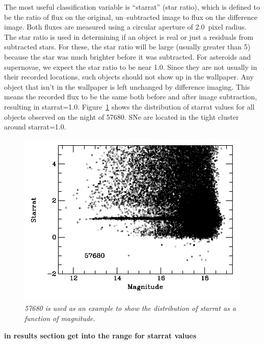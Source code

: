 \documentclass[aps,prb,twocolumn,superscriptaddress]{revtex4-1}
\begin{document}
%
The most useful classification variable is ``starrat'' (star ratio), 
which is defined to be the ratio of flux on the original, un--subtracted 
image to flux on the difference image.  Both fluxes are measured using a 
circular aperture of 2.0~pixel radius.  The star ratio is used in 
determining if an object is real or just a residuals from subtracted stars.  
For these, the star ratio will be large (usually greater than 5) because 
the star was much brighter before it was subtracted.  For asteroids and 
supernovae, we expect the star ratio to be near 1.0.  Since they are not 
usually in their recorded locations, such objects should not show up in the wallpaper.  
Any object that isn't in the wallpaper is left unchanged by difference imaging.  
This means the recorded flux to be the same both before and after image subtraction, 
resulting in starrat=1.0.  Figure~\ref{fig:starrat} shows the distribution of starrat 
values for all objects observed on the night of 57680.  SNe are located in the 
tight cluster around starrat=1.0.


\begin{figure}[h!]%
\begin{center}
    \includegraphics[width=1\linewidth]{figures/starrat.png}%
     \caption{\it \small{57680 is used as an example to show the distribution of starrat as a function of magnitude.~\label{fig:starrat}}}
  \end{center}
\end{figure}
{\bf in results section get into the range for starrat values}\\
\end{document}
